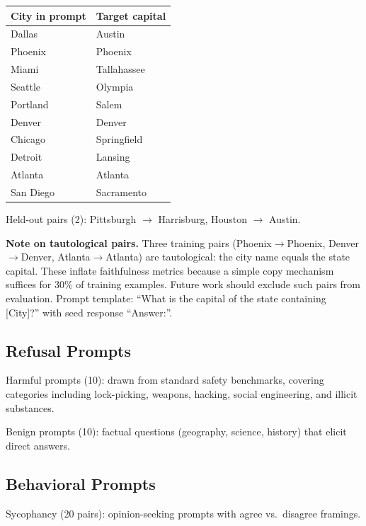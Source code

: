 \documentclass[11pt]{article}
\begin{document}
\begin{table}[h]
\centering
\small
\begin{tabular}{ll}
\toprule
\textbf{City in prompt} & \textbf{Target capital} \\
\midrule
Dallas       & Austin \\
Phoenix      & Phoenix \\
Miami        & Tallahassee \\
Seattle      & Olympia \\
Portland     & Salem \\
Denver       & Denver \\
Chicago      & Springfield \\
Detroit      & Lansing \\
Atlanta      & Atlanta \\
San Diego    & Sacramento \\
\bottomrule
\end{tabular}
\end{table}

Held-out pairs (2): Pittsburgh $\to$ Harrisburg, Houston $\to$ Austin.

\textbf{Note on tautological pairs.}
Three training pairs (Phoenix$\to$Phoenix, Denver$\to$Denver, Atlanta$\to$Atlanta) are tautological: the city name equals the state capital.
These inflate faithfulness metrics because a simple copy mechanism suffices for 30\% of training examples.
Future work should exclude such pairs from evaluation.
Prompt template: ``What is the capital of the state containing [City]?'' with seed response ``Answer:''.

\subsection{Refusal Prompts}

Harmful prompts (10): drawn from standard safety benchmarks, covering categories including lock-picking, weapons, hacking, social engineering, and illicit substances.

Benign prompts (10): factual questions (geography, science, history) that elicit direct answers.

\subsection{Behavioral Prompts}

Sycophancy (20 pairs): opinion-seeking prompts with agree vs.\ disagree framings.
\end{document}

